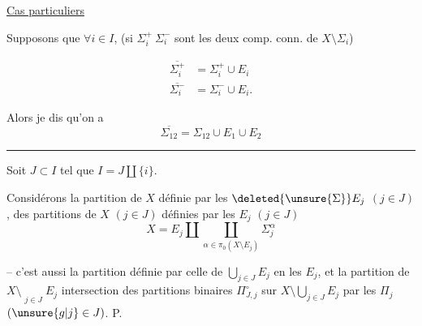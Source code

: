 \uline{Cas particuliers}

Supposons que $\forall i\in I$,   (si $\Sigma_i^+\ \Sigma_i^-$ sont les deux comp. conn. de $X\setminus\Sigma_i$)

\[
\begin{aligned}
\overline{\Sigma_i^+} &= \Sigma_i^+\cup E_i\\
\overline{\Sigma_i^-} &= \Sigma_i^-\cup E_i .
\end{aligned}
\]

Alors je dis qu'on a
\[
\overline{\Sigma_{12}}=\Sigma_{12}\cup E_1\cup E_2
\]

\noindent\rule{2.4cm}{0.3pt}\par

\reversemarginpar
{}
\normalmarginpar
{}

Soit $J\subset I$ tel que $I=J\amalg\{i\}$.

Considérons la partition  de $X$  définie par les $\deleted{\unsure{\Sigma}}E_j$ $(j\in J)$,   des partitions  de $X$ $(j\in J)$ définies par les $E_j$  $(j\in J)$
\[
X=E_j\amalg\coprod_{\alpha\in\pi_0(X\setminus E_j)}\Sigma_j^\alpha
\]

-- c'est aussi la partition définie par celle de $\displaystyle\bigcup_{j\in J}E_j$ en les $E_j$, et la partition  de $\displaystyle X\setminus\mathop{\overline{\bigcup}}\limits_{j\in J}E_j$ intersection des partitions binaires $\Pi_{J,j}^{\circ}$   sur  $\displaystyle X\setminus\bigcup_{j\in J}E_j$ par les $\Pi_j$ $(\unsure{g|j}\in J)$. P. 
